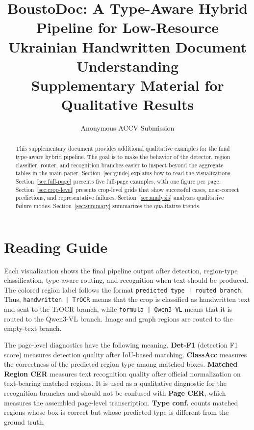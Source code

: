 \documentclass[runningheads]{llncs}
\newcommand{\metric}[1]{\textbf{#1}}
\begin{document}
\title{BoustoDoc: A Type-Aware Hybrid Pipeline for Low-Resource Ukrainian Handwritten Document Understanding \\
\small Supplementary Material for Qualitative Results}

\author{Anonymous ACCV Submission}

\maketitle

\begin{abstract}
This supplementary document provides additional qualitative examples for the final type-aware hybrid pipeline. The goal is to make the behavior of the detector, region classifier, router, and recognition branches easier to inspect beyond the aggregate tables in the main paper. Section~\ref{sec:guide} explains how to read the visualizations. Section~\ref{sec:full-page} presents five full-page examples, with one figure per page. Section~\ref{sec:crop-level} presents crop-level grids that show successful cases, near-correct predictions, and representative failures. Section~\ref{sec:analysis} analyzes qualitative failure modes. Section~\ref{sec:summary} summarizes the qualitative trends.
\end{abstract}

\section{Reading Guide}
\label{sec:guide}

Each visualization shows the final pipeline output after detection, region-type classification, type-aware routing, and recognition when text should be produced. The colored region label follows the format \texttt{predicted type | routed branch}. Thus, \texttt{handwritten | TrOCR} means that the crop is classified as handwritten text and sent to the TrOCR branch, while \texttt{formula | Qwen3-VL} means that it is routed to the Qwen3-VL branch. Image and graph regions are routed to the empty-text branch.

The page-level diagnostics have the following meaning. \metric{Det-F1} (detection F1 score) measures detection quality after IoU-based matching. \metric{ClassAcc} measures the correctness of the predicted region type among matched boxes. \metric{Matched Region CER} measures text recognition quality after official normalization on text-bearing matched regions. It is used as a qualitative
diagnostic for the recognition branches and should not be confused with \metric{Page CER}, which measures the assembled page-level transcription. \metric{Type conf.} counts matched regions whose box is correct but whose predicted type is different from the ground truth.
\end{document}
